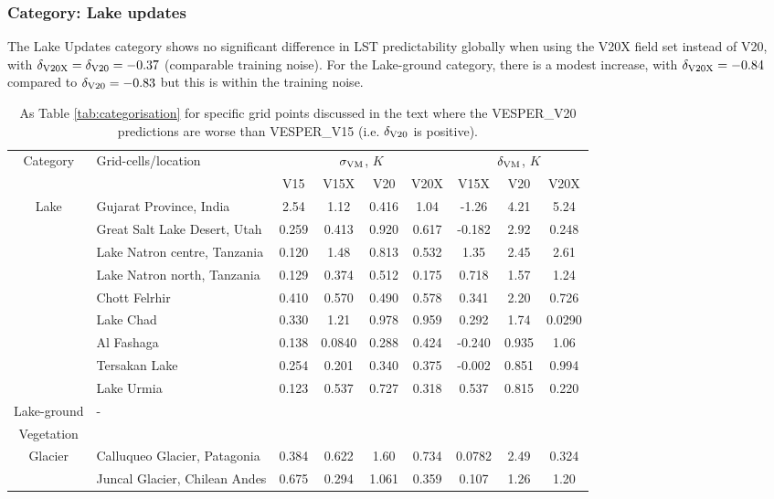 \documentclass[hess, twostagejnl]{copernicus}
\begin{document}
\subsubsection{Category: Lake updates}\label{sec:lake2}
The Lake Updates category shows no significant difference in LST predictability globally when using the V20X field set instead of V20, with $\delta_{\rm V20X} = \delta_{\rm V20} = -0.37$ (comparable training noise). For the Lake-ground category, there is a modest increase, with $\delta_{\rm V20X} = -0.84$ compared to   $\delta_{\rm V20} = -0.83$ but this is within the training noise.
\begin{table}
	\begin{tabular}{clccccccc}
		\toprule
		\multirow{2}{*}{Category} & \multirow{2}{*}{Grid-cells/location} & 	\multicolumn{4}{c}{$\sigma_{\rm VM}$, $K$} &\multicolumn{3}{c}{$\delta_{\rm VM}$, $K$} \\  
		&&V15  & V15X & V20 & V20X & V15X &V20 & V20X  \\
		\hline 
		\multirow{9}{*}{Lake}&Gujarat Province, India& 2.54 &1.12 &0.416 &1.04 & -1.26 &4.21& 5.24 \\
		&Great Salt Lake Desert, Utah&0.259 &0.413 &0.920 &0.617 & -0.182 &2.92 &0.248\\
		&Lake Natron centre, Tanzania&0.120 &1.48 &0.813& 0.532 & 1.35& 2.45& 2.61 \\
		&Lake Natron north, Tanzania&0.129 &0.374 &0.512& 0.175 & 0.718 &1.57 &1.24 \\
		&Chott Felrhir&0.410 &0.570& 0.490& 0.578 & 0.341 &2.20& 0.726 \\
		&Lake Chad&0.330 &1.21 &0.978 &0.959 & 0.292 &1.74 &0.0290\\
		&Al Fashaga&0.138 &0.0840 &0.288 &0.424 & -0.240& 0.935 &1.06 \\
		&Tersakan Lake&0.254 &0.201& 0.340 &0.375 & -0.002 &0.851 &0.994 \\
		&Lake Urmia&0.123& 0.537 &0.727 &0.318 & 0.537 &0.815 &0.220 \\
		\hline 
		Lake-ground&-& &  &  &  & & &   \\
		\hline
		Vegetation&& &  &  &  & & &   \\
		\hline 
		\multirow{2}{*}{Glacier}&Calluqueo Glacier, Patagonia&0.384 &0.622& 1.60 &0.734 & 0.0782& 2.49 &0.324\\
		&Juncal Glacier, Chilean Andes &0.675& 0.294& 1.061& 0.359 & 0.107 &1.26 &1.20 \\
		\bottomrule
	\end{tabular}
	\caption{As Table \ref{tab:categorisation} for specific grid points discussed in the text where the VESPER\_V20 predictions are worse than VESPER\_V15 (i.e. $\delta_{\rm V20}$ is positive).}
	\label{tab:categorisation2}
\end{table}
\end{document}
